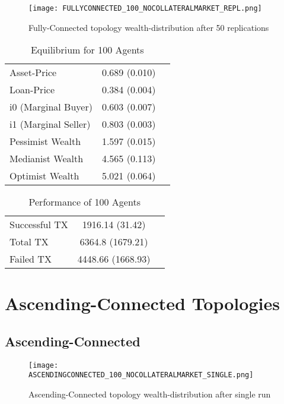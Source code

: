 \documentclass[Bachelorarbeit.tex]{subfiles}
\begin{document}
\begin{figure}[!htbp]
	\centering
  \texttt{[image: FULLYCONNECTED\_100\_NOCOLLATERALMARKET\_REPL.png]}
	\caption{Fully-Connected topology wealth-distribution after 50 replications}
	\label{fig1}
\end{figure}

\begin{table}[h]
	\caption{Equilibrium for 100 Agents}
	\centering
	\begin{tabular} { l c r }
		\hline
		Asset-Price & 0.689 (0.010) \\
		Loan-Price & 0.384 (0.004) \\
		i0 (Marginal Buyer) & 0.603 (0.007) \\
		i1 (Marginal Seller) & 0.803 (0.003) \\
		Pessimist Wealth & 1.597 (0.015) \\
		Medianist Wealth & 4.565 (0.113) \\
		Optimist Wealth & 5.021 (0.064) \\
		\hline
	\end{tabular}
\end{table} 

\begin{table}[h]
	\caption{Performance of 100 Agents}
	\centering
	\begin{tabular} { l c r }
		\hline
		Successful TX & 1916.14 (31.42) \\
		Total TX & 6364.8 (1679.21) \\
		Failed TX & 4448.66 (1668.93) \\
		\hline
	\end{tabular}
\end{table}


\section{Ascending-Connected Topologies} 

\subsection{Ascending-Connected}
\begin{figure}[!htbp]
	\centering
  \texttt{[image: ASCENDINGCONNECTED\_100\_NOCOLLATERALMARKET\_SINGLE.png]}
	\caption{Ascending-Connected topology wealth-distribution after single run}
	\label{fig1}
\end{figure}
\end{document}
